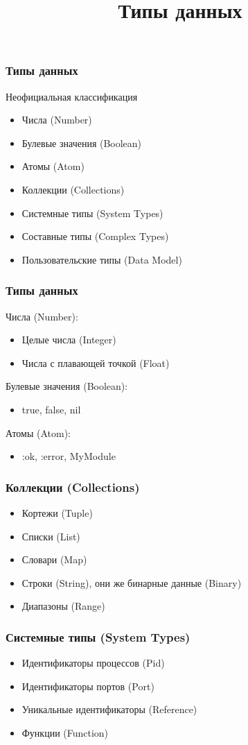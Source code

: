 \documentclass[10pt]{beamer}
\title{Типы данных}
\begin{document}
\begin{frame}
  \frametitle{Типы данных}
  Неофициальная классификация
  \par \bigskip
  \begin{itemize}
    \item Числа (Number)
    \item Булевые значения (Boolean)
    \item Атомы (Atom)
    \item Коллекции (Collections)
    \item Системные типы (System Types)
    \item Составные типы (Complex Types)
    \item Пользовательские типы (Data Model)
  \end{itemize}
\end{frame}

\begin{frame}
  \frametitle{Типы данных}
  Числа (Number):
  \begin{itemize}
    \item Целые числа (Integer)
    \item Числа с плавающей точкой (Float)
  \end{itemize}
  \par \bigskip
  Булевые значения (Boolean):
  \begin{itemize}
    \item true, false, nil
  \end{itemize}
  \par \bigskip
  Атомы (Atom):
  \begin{itemize}
    \item :ok, :error, MyModule
  \end{itemize}
\end{frame}

\begin{frame}
  \frametitle{Коллекции (Collections)}
  \begin{itemize}
    \item Кортежи (Tuple)
    \item Списки (List)
    \item Словари (Map)
    \item Строки (String), они же бинарные данные (Binary)
    \item Диапазоны (Range)
  \end{itemize}
\end{frame}

\begin{frame}
  \frametitle{Системные типы (System Types)}
  \begin{itemize}
    \item Идентификаторы процессов (Pid)
    \item Идентификаторы портов (Port)
    \item Уникальные идентификаторы (Reference)
    \item Функции (Function)
  \end{itemize}
\end{frame}
\end{document}
